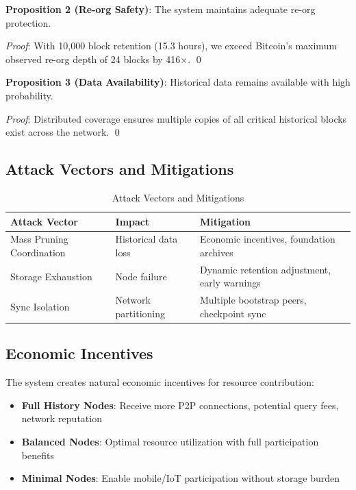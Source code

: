 \documentclass[11pt,a4paper]{article}
\begin{document}
\textbf{Proposition 2 (Re-org Safety)}: The system maintains adequate re-org protection.

\textit{Proof}: With 10,000 block retention (15.3 hours), we exceed Bitcoin's maximum observed re-org depth of 24 blocks by 416×. \qed

\textbf{Proposition 3 (Data Availability)}: Historical data remains available with high probability.

\textit{Proof}: Distributed coverage ensures multiple copies of all critical historical blocks exist across the network. \qed

\subsection{Attack Vectors and Mitigations}

\begin{table}[h]
\centering
\begin{tabular}{lll}
\toprule
\textbf{Attack Vector} & \textbf{Impact} & \textbf{Mitigation} \\
\midrule
Mass Pruning Coordination & Historical data loss & Economic incentives, foundation archives \\
Storage Exhaustion & Node failure & Dynamic retention adjustment, early warnings \\
Sync Isolation & Network partitioning & Multiple bootstrap peers, checkpoint sync \\
\bottomrule
\end{tabular}
\caption{Attack Vectors and Mitigations}
\end{table}

\subsection{Economic Incentives}

The system creates natural economic incentives for resource contribution:

\begin{itemize}
\item \textbf{Full History Nodes}: Receive more P2P connections, potential query fees, network reputation
\item \textbf{Balanced Nodes}: Optimal resource utilization with full participation benefits
\item \textbf{Minimal Nodes}: Enable mobile/IoT participation without storage burden
\end{itemize}
\end{document}
